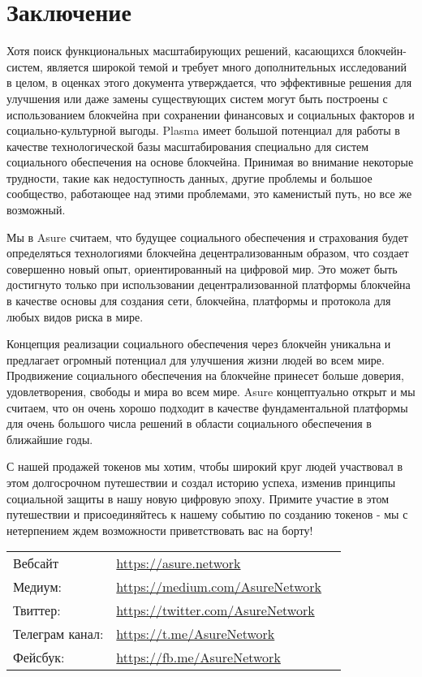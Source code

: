 \section*{Заключение}

Хотя поиск функциональных масштабирующих решений, касающихся блокчейн-систем, является широкой темой и требует много дополнительных исследований в целом, в оценках этого документа утверждается, что эффективные решения для улучшения или даже замены существующих систем могут быть построены с использованием блокчейна при сохранении финансовых и социальных факторов и социально-культурной выгоды.
Plasma имеет большой потенциал для работы в качестве технологической базы масштабирования специально для систем социального обеспечения на основе блокчейна. Принимая во внимание некоторые трудности, такие как недоступность данных, другие проблемы и большое сообщество, работающее над этими проблемами, это каменистый путь, но все же возможный.
\newline

Мы в Asure считаем, что будущее социального обеспечения и страхования будет определяться технологиями блокчейна децентрализованным образом, что создает совершенно новый опыт, ориентированный на цифровой мир. Это может быть достигнуто только при использовании децентрализованной платформы блокчейна в качестве основы для создания сети, блокчейна, платформы и протокола для любых видов риска в мире. 
\newline

Концепция реализации социального обеспечения через блокчейн уникальна и предлагает огромный потенциал для улучшения жизни людей во всем мире. Продвижение социального обеспечения на блокчейне принесет больше доверия, удовлетворения, свободы и мира во всем мире. Asure концептуально открыт и мы считаем, что он очень хорошо подходит в качестве фундаментальной платформы для очень большого числа решений в области социального обеспечения в ближайшие годы.
\newline

С нашей продажей токенов мы хотим, чтобы широкий круг людей участвовал в этом долгосрочном путешествии и создал историю успеха, изменив принципы социальной защиты в нашу новую цифровую эпоху. Примите участие в этом путешествии и присоединяйтесь к нашему событию по созданию токенов - мы с нетерпением ждем возможности приветствовать вас на борту!
\newline\newline

\begin{table}[H]
\begin{tabular}{lp{}l}
  Вебсайт & \url{https://asure.network}\\
  Медиум: & \url{https://medium.com/AsureNetwork}\\
  Твиттер: & \url{https://twitter.com/AsureNetwork}\\
  Телеграм канал: & \url{https://t.me/AsureNetwork}\\
  Фейсбук: & \url{https://fb.me/AsureNetwork}\\
\end{tabular}
\end{table} 